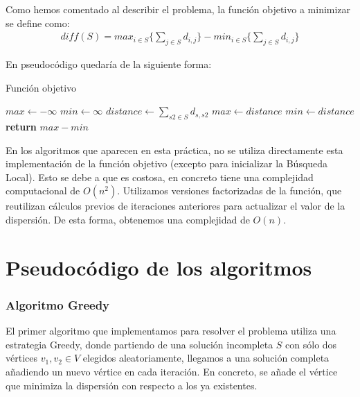 Como hemos comentado al describir el problema, la función objetivo a minimizar se define como:
\begin{align*}
    diff(S) = max_{i \in S} \{ \sum_{j \in S} d_{i,j}\} - min_{i \in S} \{ \sum_{j \in S} d_{i,j}\}
\end{align*}

\noindent En pseudocódigo quedaría de la siguiente forma:
\begin{algorithm}
    \caption{Función objetivo}
\begin{algorithmic}
\State $max \gets -\infty$
\State $min \gets \infty$
    \State $distance \gets \sum_{s2 \in S} d_{s,s2}$
        \State $max \gets distance$
    \EndIf
        \State $min \gets distance$
    \EndIf
\EndFor
\State \textbf{return} $max - min$
\end{algorithmic}
\end{algorithm}

En los algoritmos que aparecen en esta práctica, no se utiliza directamente esta implementación de la función objetivo (excepto para inicializar la Búsqueda Local). Esto se debe a que es costosa, en concreto tiene una complejidad computacional de $O(n^2)$. Utilizamos versiones factorizadas de la función, que reutilizan cálculos previos de iteraciones anteriores para actualizar el valor de la dispersión. De esta forma, obtenemos una complejidad de $O(n)$.




\part{Pseudocódigo de los algoritmos}



\section{Algoritmo Greedy}

El primer algoritmo que implementamos para resolver el problema utiliza una estrategia Greedy, donde partiendo de una solución incompleta $S$ con sólo dos vértices $v_1,v_2 \in V$ elegidos aleatoriamente, llegamos a una solución completa añadiendo un nuevo vértice en cada iteración. En concreto, se añade el vértice que minimiza la dispersión con respecto a los ya existentes.

